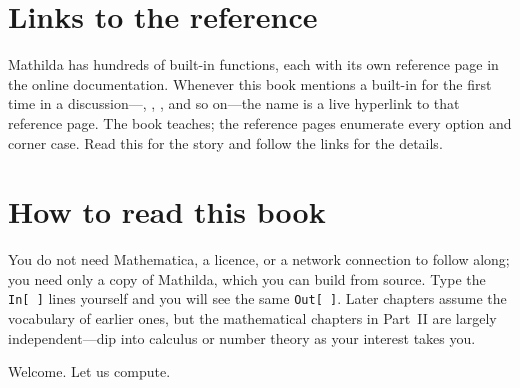 \section*{Links to the reference}

Mathilda has hundreds of built-in functions, each with its own reference page in
the online documentation. Whenever this book mentions a built-in for the first
time in a discussion---, , , and so
on---the name is a live hyperlink to that reference page. The book teaches; the
reference pages enumerate every option and corner case. Read this for the story
and follow the links for the details.

\section*{How to read this book}

You do not need Mathematica, a licence, or a network connection to follow along;
you need only a copy of Mathilda, which you can build from source. Type the
\texttt{In[\,]} lines yourself and you will see the same \texttt{Out[\,]}. Later
chapters assume the vocabulary of earlier ones, but the mathematical chapters in
Part~II are largely independent---dip into calculus or number theory as your
interest takes you.

Welcome. Let us compute.
